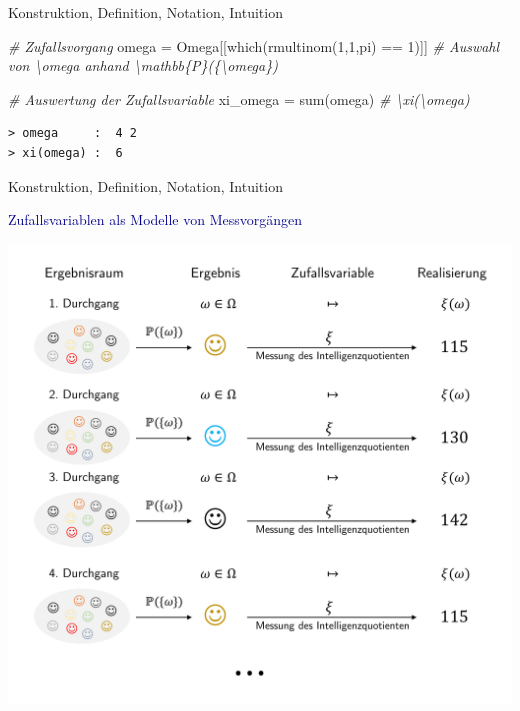 \documentclass[
  8pt,
  ignorenonframetext,
]{beamer}
\newenvironment{Shaded}{\begin{snugshade}}{\end{snugshade}}
\newcommand{\CommentTok}[1]{\textcolor[rgb]{0.56,0.35,0.01}{\textit{#1}}}
\newcommand{\DecValTok}[1]{\textcolor[rgb]{0.00,0.00,0.81}{#1}}
\newcommand{\FunctionTok}[1]{\textcolor[rgb]{0.00,0.00,0.00}{#1}}
\newcommand{\NormalTok}[1]{#1}
\newcommand{\OtherTok}[1]{\textcolor[rgb]{0.56,0.35,0.01}{#1}}
\newcommand{\SpecialCharTok}[1]{\textcolor[rgb]{0.00,0.00,0.00}{#1}}
\begin{document}
\begin{frame}[fragile]{Konstruktion, Definition, Notation, Intuition}
\begin{Shaded}
\begin{Highlighting}[]
\CommentTok{\# Zufallsvorgang}
\NormalTok{omega    }\OtherTok{=}\NormalTok{ Omega[[}\FunctionTok{which}\NormalTok{(}\FunctionTok{rmultinom}\NormalTok{(}\DecValTok{1}\NormalTok{,}\DecValTok{1}\NormalTok{,pi) }\SpecialCharTok{==} \DecValTok{1}\NormalTok{)]] }\CommentTok{\# Auswahl von \textbackslash{}omega anhand \textbackslash{}mathbb\{P\}(\{\textbackslash{}omega\})}

\CommentTok{\# Auswertung der Zufallsvariable}
\NormalTok{xi\_omega }\OtherTok{=} \FunctionTok{sum}\NormalTok{(omega)                             }\CommentTok{\# \textbackslash{}xi(\textbackslash{}omega)}
\end{Highlighting}
\end{Shaded}


\begin{verbatim}
> omega     :  4 2 
> xi(omega) :  6
\end{verbatim}
\end{frame}

\begin{frame}{Konstruktion, Definition, Notation, Intuition}
\protect\hypertarget{konstruktion-definition-notation-intuition-7}{}
\vspace{1mm}

\textcolor{darkblue}{Zufallsvariablen als Modelle von Messvorgängen}
\vspace{-1mm} \footnotesize {}

\begin{center}\includegraphics[width=0.7\linewidth]{4_Abbildungen/wtfi_4_zufallsvariable_messen} \end{center}
\end{frame}
\end{document}

